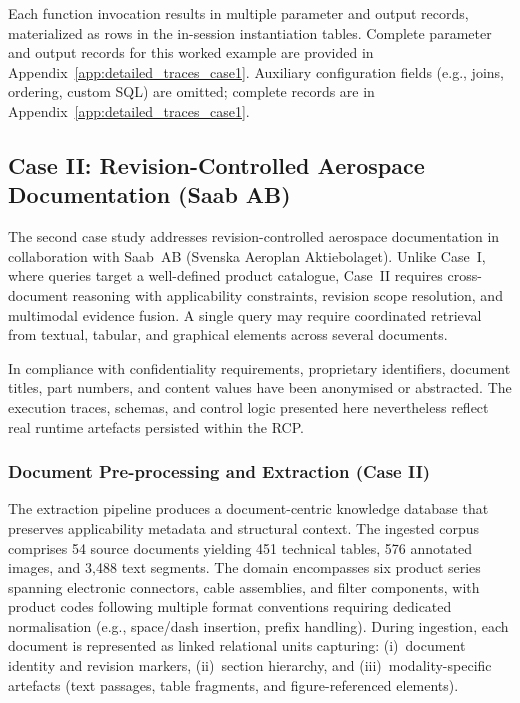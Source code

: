 \documentclass[largeformat]{interact}
\begin{document}
Each function invocation results in multiple parameter and output records, materialized as rows in the in-session instantiation tables. Complete parameter and output records for this worked example are provided in Appendix~\ref{app:detailed_traces_case1}. Auxiliary configuration fields (e.g., joins, ordering, custom SQL) are omitted; complete records are in Appendix~\ref{app:detailed_traces_case1}.


\subsection{Case II: Revision-Controlled Aerospace Documentation (Saab AB)}
\label{subsec:saab_case}
The second case study addresses revision-controlled aerospace documentation in collaboration with Saab~AB (Svenska Aeroplan Aktiebolaget). Unlike Case~I, where queries target a well-defined product catalogue, Case~II requires cross-document reasoning with applicability constraints, revision scope resolution, and multimodal evidence fusion. A single query may require coordinated retrieval from textual, tabular, and graphical elements across several documents.

In compliance with confidentiality requirements, proprietary identifiers, document titles, part numbers, and content values have been anonymised or abstracted. The execution traces, schemas, and control logic presented here nevertheless reflect real runtime artefacts persisted within the RCP.

\subsubsection{Document Pre-processing and Extraction (Case II)}
\label{subsubsec:saab_document_harvesting}
The extraction pipeline produces a document-centric knowledge database that preserves applicability metadata and structural context. The ingested corpus comprises 54 source documents yielding 451 technical tables, 576 annotated images, and 3{,}488 text segments. The domain encompasses six product series spanning electronic connectors, cable assemblies, and filter components, with product codes following multiple format conventions requiring dedicated normalisation (e.g., space/dash insertion, prefix handling). During ingestion, each document is represented as linked relational units capturing: (i)~document identity and revision markers, (ii)~section hierarchy, and (iii)~modality-specific artefacts (text passages, table fragments, and figure-referenced elements).
\end{document}
